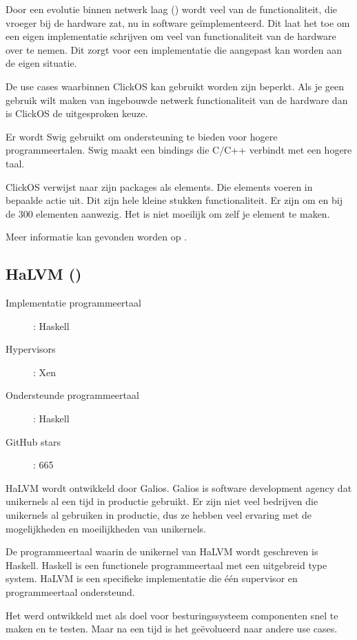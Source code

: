 \documentclass[pdftex,a4paper,12pt,twoside]{report}
\begin{document}
Door een evolutie binnen netwerk laag (\cite{garcia_villalba_trends_2015}) wordt veel van de functionaliteit, die vroeger bij de hardware zat, nu in software geïmplementeerd. Dit laat het toe om een eigen implementatie schrijven om veel van functionaliteit van de hardware over te nemen.
Dit zorgt voor een implementatie die aangepast kan worden aan de eigen situatie.

De use cases waarbinnen ClickOS kan gebruikt worden zijn beperkt. Als je geen gebruik wilt maken van ingebouwde netwerk functionaliteit van de hardware dan is ClickOS de uitgesproken keuze.

Er wordt Swig gebruikt om ondersteuning te bieden voor hogere programmeertalen. Swig maakt een bindings die C/C++ verbindt met een hogere taal.

ClickOS verwijst naar zijn packages als elements. Die elements voeren in bepaalde actie uit. Dit zijn hele kleine stukken functionaliteit. Er zijn om en bij de 300 elementen aanwezig. Het is niet moeilijk om zelf je element te maken.

Meer informatie kan gevonden worden op \cite{cloud_networking_performance_lab_cloud_????}.

\subsection{HaLVM (\cite{galois_inc._haskell_????})}

\begin{description}
  \item [Implementatie programmeertaal]: Haskell
  \item [Hypervisors]: Xen
  \item [Ondersteunde programmeertaal]: Haskell
  \item [GitHub stars]: 665
\end{description}

HaLVM wordt ontwikkeld door Galios. Galios is software development agency dat unikernels al een tijd in productie gebruikt.
Er zijn niet veel bedrijven die unikernels al gebruiken in productie, dus ze hebben veel ervaring met de mogelijkheden en moeilijkheden van unikernels.

De programmeertaal waarin de unikernel van HaLVM wordt geschreven is Haskell. Haskell is een functionele programmeertaal met een uitgebreid type system. HaLVM is een specifieke implementatie die één supervisor en programmeertaal ondersteund.

Het werd ontwikkeld met als doel voor besturingssysteem componenten snel te maken en te testen. Maar na een tijd is het geëvolueerd naar andere use cases.
\end{document}
